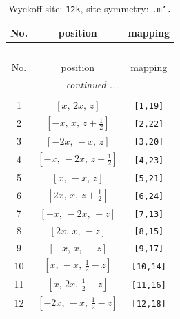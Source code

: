 \documentclass[fleqn,8pt]{jsarticle}
\begin{document}
\begin{longtable}{ccc}
\caption{Wyckoff site: {\tt 12k}, site symmetry: {\tt .m'.}}
 \\
 \hline \hline
No. & position & mapping \\ \hline \endfirsthead

\multicolumn{2}{l}{\tablename\ \thetable{}} \\
 \hline \hline
No. & position & mapping \\ \hline \endhead

 \hline \hline
\multicolumn{2}{r}{\footnotesize\it continued ...} \\ \endfoot

 \hline \hline
\multicolumn{2}{r}{} \\ \endlastfoot

1 & $\left[ x,\, 2 x,\, z \right]$ & {\tt [1,19]} \\ \hline
2 & $\left[ - x,\, x,\, z + \frac{1}{2} \right]$ & {\tt [2,22]} \\ \hline
3 & $\left[ - 2 x,\, - x,\, z \right]$ & {\tt [3,20]} \\ \hline
4 & $\left[ - x,\, - 2 x,\, z + \frac{1}{2} \right]$ & {\tt [4,23]} \\ \hline
5 & $\left[ x,\, - x,\, z \right]$ & {\tt [5,21]} \\ \hline
6 & $\left[ 2 x,\, x,\, z + \frac{1}{2} \right]$ & {\tt [6,24]} \\ \hline
7 & $\left[ - x,\, - 2 x,\, - z \right]$ & {\tt [7,13]} \\ \hline
8 & $\left[ 2 x,\, x,\, - z \right]$ & {\tt [8,15]} \\ \hline
9 & $\left[ - x,\, x,\, - z \right]$ & {\tt [9,17]} \\ \hline
10 & $\left[ x,\, - x,\, \frac{1}{2} - z \right]$ & {\tt [10,14]} \\ \hline
11 & $\left[ x,\, 2 x,\, \frac{1}{2} - z \right]$ & {\tt [11,16]} \\ \hline
12 & $\left[ - 2 x,\, - x,\, \frac{1}{2} - z \right]$ & {\tt [12,18]} \\
\end{longtable}
\renewcommand{\arraystretch}{1.2}
\end{document}
